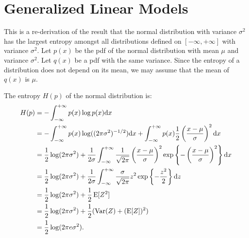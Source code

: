 \chapter{Generalized Linear Models}

This is a re-derivation of the result that the normal distribution with variance 
$\sigma^2$ has the largest entropy amongst all distributions defined on 
$[-\infty, +\infty]$ with variance $\sigma^2$. Let $p(x)$ be the pdf of the 
normal distribution with mean $\mu$ and variance $\sigma^2$. Let $q(x)$ be a 
pdf with the same variance. Since the entropy of a distribution does not depend
on its mean, we may assume that the mean of $q(x)$ is $\mu$. 

The entropy $H(p)$ of the normal distribution is:
\begin{align*}
    H(p) & = - \int_{- \infty}^{+ \infty} p(x) \log p(x) \mathrm{d} x \\
        & = - \int_{- \infty}^{+ \infty} p(x) \log ((2 \pi \sigma^2)^{-1/2}) \mathrm{d} x
            + \int_{- \infty}^{+ \infty} p(x) \frac{1}{2} \left ( \frac{x - \mu}{\sigma} \right )^2 \mathrm{d} x \\
        & = \frac{1}{2} \log (2 \pi \sigma^2) 
            + \frac{1}{2 \sigma} \int_{- \infty}^{+ \infty} \frac{1}{\sqrt{2 \pi}} \left ( \frac{x - \mu}{\sigma} \right )^2 
            \exp \left \{- \left ( \frac{x - \mu}{\sigma} \right )^2 \right \} \mathrm{d} x \\
        & = \frac{1}{2} \log (2 \pi \sigma^2) + 
            \frac{1}{2 \sigma} \int_{- \infty}^{+ \infty} 
            \frac{\sigma}{\sqrt{2 \pi}} z^2 \exp \left \{- \frac{z^2}{2} \right \} \mathrm{d} z \\
        & = \frac{1}{2} \log (2 \pi \sigma^2) + \frac{1}{2} \operatorname{E} [Z^2] \\
        & = \frac{1}{2} \log (2 \pi \sigma^2) + \frac{1}{2} (\operatorname{Var}(Z) + (\operatorname{E} [Z])^2) \\
        & = \frac{1}{2} \log (2 \pi e \sigma^2).
\end{align*} 

